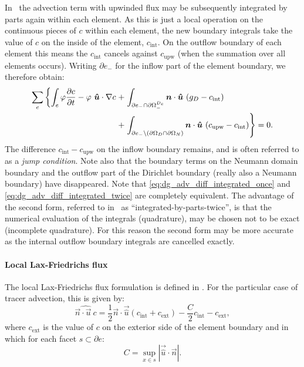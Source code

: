 In \fluidity\ the advection term with upwinded flux may be subsequently
integrated by parts again within each element. As this is just a local
operation on the continuous pieces of $c$ within each element, the new
boundary integrals take the value of $c$ on the inside of the element,
$c_{\mathrm{int}}$. On the outflow boundary of each element this means the
$c_{\mathrm{int}}$ cancels against $c_{\mathrm{upw}}$ (when the summation over all elements occurs).
Writing $\partial e_-$ for the inflow part of the element boundary, we therefore obtain:
\begin{equation}
\begin{split}
  \sum_e \left\{ \int_e \varphi \frac{\partial c}{\partial t}
  - \varphi~{\mbox{\boldmath$\hat u$}}\cdot\nabla c \right.
    +& \left. \int_{\partial e_- \cap\partial\Omega^{D_c}_-} {\mbox{\boldmath$n$}}\cdot{\mbox{\boldmath$\hat u$}}~(g_D -c_{\mathrm{int}}) \right. \\
    +& \left. \int_{\partial e_-\setminus (\partial\Omega_D\cap\partial\Omega_N)}
    {\mbox{\boldmath$n$}}\cdot{\mbox{\boldmath$\hat u$}}~
      (c_{\mathrm{upw}}-c_{\mathrm{int}}) \right\} =0.
    \label{eq:dg_adv_diff_integrated_twice}
\end{split}
\end{equation}
The difference $c_{\mathrm{int}}-c_{\mathrm{upw}}$ on the inflow boundary
remains, and is often referred to as a \emph{jump condition}. Note also that
the boundary terms on the Neumann domain boundary and the outflow part of
the Dirichlet boundary (really also a Neumann boundary) have disappeared.
Note that \eqref{eq:dg_adv_diff_integrated_once} and
\eqref{eq:dg_adv_diff_integrated_twice} are completely equivalent. The
advantage of the second form, referred to in \fluidity\ as
``integrated-by-parts-twice'', is that the numerical evaluation of the
integrals (quadrature), may be chosen not to be exact (incomplete quadrature). For this
reason the second form may be more accurate as the internal outflow boundary
integrals are cancelled exactly.

\paragraph{Local Lax-Friedrichs flux}

The local Lax-Friedrichs flux formulation is defined in
\citet[p208]{cockburn2001}. For the
particular case of tracer advection, this is given by:
\begin{equation}
  \widehat{\vec{n}\cdot\vec{u}~c}=\frac{1}{2}\vec{n}\cdot\vec{\hat u}
  \left(c_{\mathrm{int}}+c_{\mathrm{ext}}\right)
  -\frac{C}{2}c_{\mathrm{int}}-c_{\mathrm{ext}},
\end{equation}
where $c_{\mathrm{ext}}$ is the value of $c$ on the exterior side of the
  element boundary and in which for each facet $s\subset\partial e$:
\begin{equation}
  C= \sup_{x\in s}|\vec{\hat u}\cdot\vec{n}|.
\end{equation}

